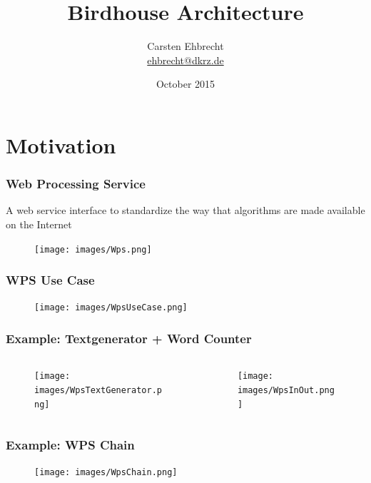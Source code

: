 \documentclass{beamer}
\title{Birdhouse Architecture}
\author{
Carsten Ehbrecht\\
\medskip
{\scriptsize \url{ehbrecht@dkrz.de}}
}
\institute{German Climate Computing Center (DKRZ)}
\date{October 2015}
\begin{document}
  \begin{frame}[plain]
    \titlepage
  \end{frame}


  \section{Motivation}

  \begin{frame}
    \frametitle{Web Processing Service}
    A web service interface to standardize the way that algorithms are made available on the Internet
    \begin{figure}
      \texttt{[image: images/Wps.png]}
    \end{figure}
  \end{frame}

  \begin{frame}[plain]
    \frametitle{WPS Use Case}
    \begin{figure}
      \texttt{[image: images/WpsUseCase.png]}
    \end{figure}
  \end{frame}

  \begin{frame}[plain]
    \frametitle{Example: Textgenerator + Word Counter}
    \begin{columns}[T] %
      \begin{column}[T]{5cm} %
        \begin{figure}
          \texttt{[image: images/WpsTextGenerator.png]}
        \end{figure}
      \end{column}
      \begin{column}[T]{5cm} %
        \begin{figure}
          \texttt{[image: images/WpsInOut.png]}
        \end{figure}
      \end{column}
    \end{columns}
  \end{frame}

  \begin{frame}[plain]
    \frametitle{Example: WPS Chain}
    \begin{figure}
      \texttt{[image: images/WpsChain.png]}
    \end{figure}
  \end{frame}
\end{document}
